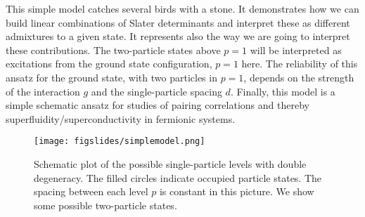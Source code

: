 \documentclass[%
twoside,                 %
final,                   %
10pt]{article}
\begin{document}
\noindent
This simple model catches several birds with a stone. It demonstrates how we can build linear combinations
of Slater determinants and interpret these as different admixtures to a given state. It represents also the way we are going to interpret these contributions.  The two-particle states above $p=1$ will be interpreted as 
excitations from the ground state configuration, $p=1$ here.  The reliability of this ansatz for the ground state, 
with two particles in $p=1$,
depends on the strength of the interaction $g$ and the single-particle spacing $d$.
Finally, this model is a simple schematic ansatz for studies of pairing correlations and thereby superfluidity/superconductivity  
in fermionic systems. 


\begin{figure}[ht]
  \centerline{\texttt{[image: figslides/simplemodel.png]}}
  \caption{
  Schematic plot of the possible single-particle levels with double degeneracy. The filled circles indicate occupied particle states. The spacing between each level $p$ is constant in this picture. We show some possible two-particle states.
  }
\end{figure}





\printindex
\end{document}
